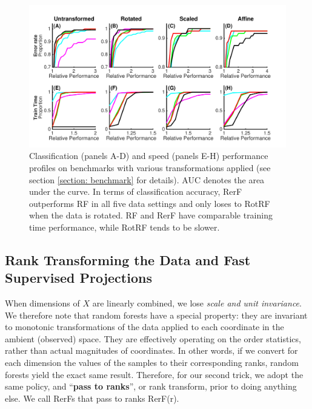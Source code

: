 \documentclass[10pt]{article}
\begin{document}
\begin{figure}[ht]
\vskip 0.2in
\begin{center}
\centerline{\includegraphics[width=\columnwidth]{../../Figures/pdf/Fig4_benchmark}}
\caption{Classification (panels A-D) and speed (panels E-H) performance profiles on benchmarks with various transformations applied (see section \ref{section: benchmark} for details). AUC denotes the area under the curve. In terms of classification accuracy, RerF outperforms RF in all five data settings and only loses to RotRF when the data is rotated. RF and RerF have comparable training time performance, while RotRF tends to be slower.}
\label{benchmark}
\end{center}
\vskip -0.2in
\end{figure}

\subsection{Rank Transforming the Data and Fast Supervised Projections}
\label{section: additions}

When dimensions of $X$ are linearly combined, we lose {\em{scale and unit invariance}}. We therefore note that random forests have a special property: they are invariant to monotonic transformations of the data applied to each coordinate in the ambient (observed) space. They are effectively operating on the order statistics, rather than actual magnitudes of coordinates. In other words, if we convert for each dimension the values of the samples to their corresponding ranks, random forests yield the exact same result. Therefore, for our second trick, we adopt the same policy, and ``{\bf{pass to ranks}}'', or rank transform,  prior to doing anything else. We call RerFs that pass to ranks RerF(r).
\end{document}
